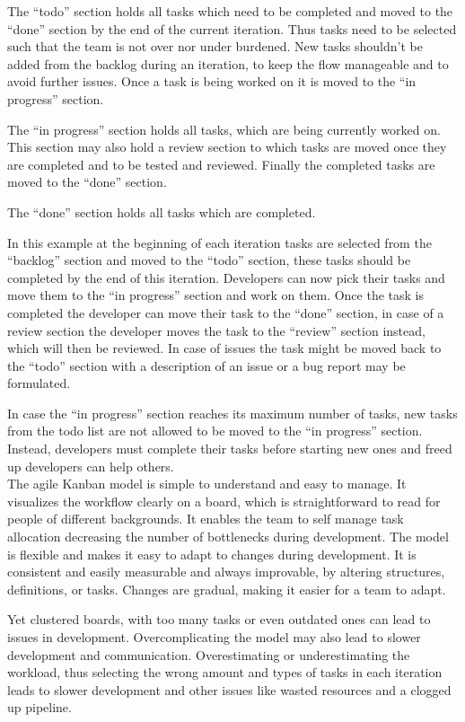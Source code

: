 \documentclass[runningheads]{llncs}
\begin{document}
The “todo” section holds all tasks which need to be completed and moved to the “done” section by the end of the current iteration. 
Thus tasks need to be selected such that the team is not over nor under burdened. New tasks shouldn’t be added from the backlog during 
an iteration, to keep the flow manageable and to avoid further issues. Once a task is being worked on it is moved to the “in progress” section.

The “in progress” section holds all tasks, which are being currently worked on. This section may also hold a review section to which 
tasks are moved once they are completed and to be tested and reviewed. Finally the completed tasks are moved to the “done” section.

The “done” section holds all tasks which are completed.

In this example at the beginning of each iteration tasks are selected from the “backlog” section and moved to the “todo” section, 
these tasks should be completed by the end of this iteration. Developers can now pick their tasks and move them to the “in progress” 
section and work on them. Once the task is completed the developer can move their task to the “done” section, in case of a review section 
the developer moves the task to the “review” section instead, which will then be reviewed. In case of issues the task might be moved back 
to the “todo” section with a description of an issue or a bug report may be formulated.

In case the “in progress” section reaches its maximum number of tasks, new tasks from the todo list are not allowed to be moved to the 
“in progress” section. Instead, developers must complete their tasks before starting new ones and freed up developers can help others.  \\

The agile Kanban model is simple to understand and easy to manage. It visualizes the workflow clearly on a board, which 
is straightforward to read for people of different backgrounds. It enables the team to self manage task allocation decreasing 
the number of bottlenecks during development. The model  is flexible and makes it easy to adapt to changes during development. 
It is consistent and easily measurable and always improvable, by altering structures, definitions, or tasks. Changes are gradual, 
making it easier for a team to adapt.

Yet clustered boards, with too many tasks or even outdated ones can lead to issues in development. Overcomplicating the model may 
also lead to slower development and communication. Overestimating or underestimating the workload, thus selecting the wrong amount and
types of tasks in each iteration leads to slower development and other issues like wasted resources and a clogged up pipeline.
\end{document}
